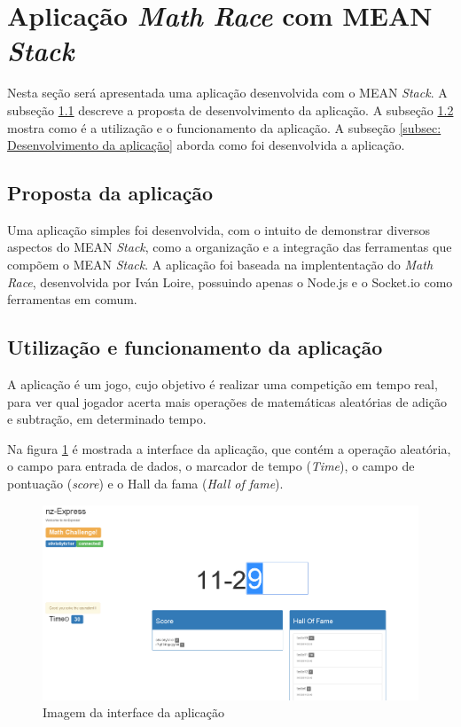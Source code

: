 \newpage
   
\section{Aplicação \textit{Math Race} com MEAN \textit{Stack}}
\label{Aplicação Math Race com MEAN Stack}
Nesta seção será apresentada uma aplicação desenvolvida com o MEAN \textit{Stack}. A subseção \ref{subsec: Proposta de desenvolvimento} descreve a proposta de desenvolvimento da aplicação. A subseção \ref{subsec: Utilização e funcionamento da aplicação} mostra como é a utilização e o funcionamento da aplicação. A subseção \ref{subsec: Desenvolvimento da aplicação} aborda como foi desenvolvida a aplicação. 

\subsection{Proposta da aplicação}
\label{subsec: Proposta de desenvolvimento}
 Uma aplicação simples foi desenvolvida, com o intuito de demonstrar diversos aspectos do MEAN \textit{Stack}, como a organização e a integração das ferramentas que compõem o MEAN \textit{Stack}. A aplicação foi baseada na implententação do \textit{Math Race}, desenvolvida por Iván Loire\cite{MathRace}, possuindo apenas o Node.js e o Socket.io como ferramentas em comum.

\subsection{Utilização e funcionamento da aplicação}
\label{subsec: Utilização e funcionamento da aplicação}
 A aplicação é um jogo, cujo objetivo é realizar uma competição em tempo real, para ver qual jogador acerta mais operações de matemáticas aleatórias de adição e subtração, em determinado tempo.

Na figura \ref{fig:Imagem da interface da aplicação} é mostrada a interface da aplicação, que contém a operação aleatória, o campo para entrada de dados, o marcador de tempo (\textit{Time}), o campo de pontuação (\textit{score}) e o Hall da fama (\textit{Hall of fame}).

    \begin{figure}[htb]
    \centering
    \includegraphics[scale=0.3]{images/index_mean_math_race.png}
    \caption{Imagem da interface da aplicação}
    \label{fig:Imagem da interface da aplicação}
    \end{figure}
    
